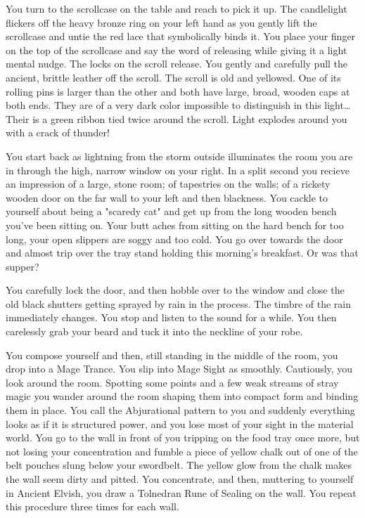 {{You turn to the scrollcase on the table and reach to pick it up. The 
candlelight flickers off the heavy bronze ring on your left hand as you 
gently lift the scrollcase and untie the red lace that symbolically 
binds it. You place your finger on the top of the scrollcase and say the 
word of releasing while giving it a light mental nudge.
The locks on the scroll release. You gently and carefully pull the 
ancient, brittle leather off the scroll. The scroll is old and yellowed. 
One of its rolling pins is larger than the other and both have large, 
broad, wooden caps at both ends. They are of a very dark color 
impossible to distinguish in this light\dots Their is a green ribbon 
tied twice around the scroll. Light explodes around you with a crack of 
thunder!

You start back as lightning from the storm outside illuminates the room 
you are in through the high, narrow window on your right. In a split 
second you recieve an impression of a large, stone room; of tapestries 
on the walls; of a rickety wooden door on the far wall to your left\- 
and then blackness. You cackle to yourself about being a "scaredy cat" 
and get up from the long wooden bench you've been sitting on. Your butt 
aches from sitting on the hard bench for too long, your open slippers 
are soggy and too cold. You go over towards the door and almost trip 
over the tray stand holding this morning's breakfast. Or was that supper? 

You carefully lock the door, and then hobble over to the window and 
close the old black shutters\- getting sprayed by rain in the process. 
The timbre of the rain immediately changes. You stop and listen to the 
sound for a while. You then carelessly grab your beard and tuck it into 
the neckline of your robe. 

You compose yourself and then, still standing in the middle of the room, 
you drop into a Mage Trance. You slip into Mage Sight as smoothly. 
Cautiously, you look around the room. Spotting some points and a few 
weak streams of stray magic you wander around the room shaping them into 
compact form and binding them in place. You call the Abjurational 
pattern to you and suddenly everything looks as if it is structured 
power, and you lose most of your sight in the material world. You go to 
the wall in front of you\- tripping on the food tray once more, but not 
losing your concentration\- and fumble a piece of yellow chalk out of 
one of the belt pouches slung below your swordbelt. The yellow glow from 
the chalk makes the wall seem dirty and pitted. You concentrate, and 
then, muttering to yourself in Ancient Elvish, you draw a Tolnedran Rune 
of Sealing on the wall. You repeat this procedure three times for each 
wall.

}}
